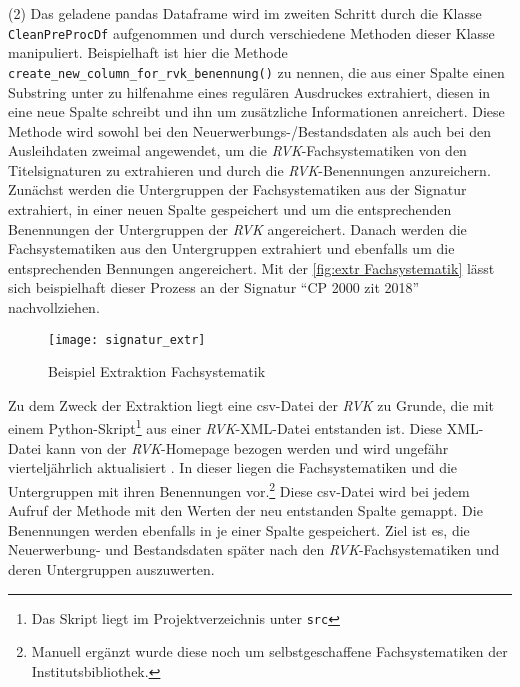     (2) Das geladene pandas Dataframe wird im zweiten Schritt durch die Klasse \texttt{CleanPreProcDf} aufgenommen und durch verschiedene Methoden dieser Klasse
    manipuliert. Beispielhaft ist hier die Methode \texttt{create\_new\_column\_for\_rvk\_benennung()} zu nennen, die aus einer Spalte einen Substring unter
    zu hilfenahme eines regulären Ausdruckes extrahiert, diesen in eine neue Spalte schreibt und ihn um zusätzliche Informationen anreichert. 
    Diese Methode wird sowohl bei den Neuerwerbungs-/Bestandsdaten als auch bei den Ausleihdaten zweimal angewendet, um die \textit{\acrshort{RVK}}-Fachsystematiken von den
    Titelsignaturen zu extrahieren und durch die \textit{\acrshort{RVK}}-Benennungen anzureichern. 
    Zunächst werden die Untergruppen der Fachsystematiken aus der Signatur extrahiert, in einer neuen Spalte gespeichert und um die entsprechenden Benennungen der Untergruppen der 
    \textit{\acrshort{RVK}} angereichert. 
    Danach werden die Fachsystematiken aus den Untergruppen extrahiert und ebenfalls um die entsprechenden Bennungen angereichert.
    Mit der \autoref{fig:extr Fachsystematik} lässt sich beispielhaft dieser Prozess an der Signatur \enquote{CP 2000 zit 2018} nachvollziehen.
    \begin{figure}[H]
        \centering
            \texttt{[image: signatur\_extr]}
            \caption{Beispiel Extraktion Fachsystematik}
            \label{fig:extr Fachsystematik}
    \end{figure}

    Zu dem Zweck der Extraktion liegt eine csv-Datei der \textit{\acrshort{RVK}} zu Grunde, die mit einem Python-Skript\footnote{ Das Skript liegt im Projektverzeichnis
    unter \texttt{src}} aus einer \textit{\acrshort{RVK}}-XML-Datei entstanden ist.
    Diese XML-Datei kann von der \textit{\acrshort{RVK}}-Homepage bezogen werden und wird ungefähr vierteljährlich aktualisiert \cite[vgl.][]{rvk_rvk_2021}.
    In dieser liegen die Fachsystematiken und die Untergruppen mit ihren Benennungen vor.\footnote{ Manuell ergänzt wurde diese noch um selbstgeschaffene Fachsystematiken der Institutsbibliothek.}
    Diese csv-Datei wird bei jedem Aufruf der Methode mit den Werten der neu entstanden Spalte gemappt. Die Benennungen werden ebenfalls in je einer Spalte gespeichert.
    Ziel ist es, die Neuerwerbung- und Bestandsdaten später nach den \textit{\acrshort{RVK}}-Fachsystematiken und deren Untergruppen auszuwerten.
    
